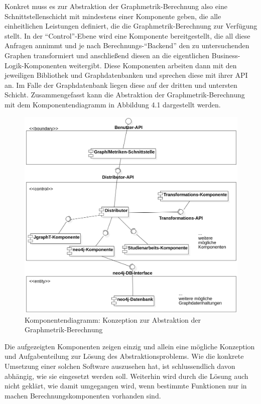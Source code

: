 \documentclass[a4paper,12pt,ngerman,chapterprefix=false,listof=totoc,bibliography=totoc]{scrreprt}
\begin{document}
{{{Konkret muss es zur Abstraktion der Graphmetrik-Berechnung also eine Schnittstellenschicht mit mindestens einer Komponente geben, die alle einheitlichen Leistungen definiert, die die Graphmetrik-Berechnung zur Verfügung stellt. In der "`Control"'-Ebene wird eine Komponente bereitgestellt, die all diese Anfragen annimmt und je nach Berechnungs-"`Backend"' den zu untersuchenden Graphen transformiert und anschließend diesen an die eigentlichen Business-Logik-Komponenten weitergibt. Diese Komponenten arbeiten dann mit den jeweiligen Bibliothek und Graphdatenbanken und sprechen diese mit ihrer API an. Im Falle der Graphdatenbank liegen diese auf der dritten und untersten Schicht. Zusammengefasst kann die Abstraktion der Graphmetrik-Berechnung mit dem Komponentendiagramm in Abbildung 4.1 dargestellt werden.
\begin{figure}[ht!]
	\centering
	\includegraphics[scale=.38]{Abbildungen/UML/component_abstraction.png}
	\caption[Komponentendiagramm: Konzeption zur Abstraktion der Graphmetrik-Berechnung]{Komponentendiagramm: Konzeption zur Abstraktion der Graphmetrik-Berechnung}
\end{figure}

Die aufgezeigten Komponenten zeigen einzig und allein eine mögliche Konzeption und Aufgabenteilung zur Lösung des Abstraktionsproblems. Wie die konkrete Umsetzung einer solchen Software auszusehen hat, ist schlussendlich davon abhängig, wie sie eingesetzt werden soll. Weiterhin wird durch die Lösung auch nicht geklärt, wie damit umgegangen wird, wenn bestimmte Funktionen nur in machen Berechnungskomponenten vorhanden sind.

}}}
\end{document}
